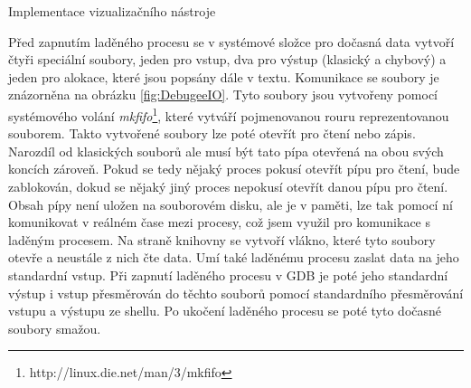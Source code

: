 \documentclass[bc,male,python,dept460]{diploma}						%
\begin{document}
\begin{section}{Implementace vizualizačního nástroje}
\begin{description}
			\par Před zapnutím laděného procesu se v systémové složce pro dočasná data vytvoří čtyři speciální soubory, jeden pro vstup, dva pro výstup
			(klasický a chybový) a jeden pro alokace, které jsou popsány dále v textu. Komunikace se soubory je znázorněna na obrázku \ref{fig:DebugeeIO}.
			Tyto soubory jsou vytvořeny pomocí systémového volání \textit{mkfifo}\footnote{http://linux.die.net/man/3/mkfifo}, které vytváří pojmenovanou rouru
			reprezentovanou souborem. Takto vytvořené soubory lze poté otevřít pro čtení nebo zápis. Narozdíl od klasických souborů ale musí být tato pípa otevřená na
			obou svých koncích zároveň. Pokud se tedy nějaký proces pokusí otevřít pípu pro čtení, bude zablokován, dokud se nějaký jiný proces nepokusí otevřít danou
			pípu pro čtení. Obsah pípy není uložen na souborovém disku, ale je v paměti, lze tak pomocí ní komunikovat v reálném čase mezi procesy, což jsem využil
			pro komunikace s laděným procesem. Na straně knihovny se vytvoří vlákno, které tyto soubory otevře a neustále z nich čte data. Umí také laděnému procesu
			zaslat data na jeho standardní vstup. Při zapnutí laděného procesu v GDB je poté jeho standardní výstup i vstup přesměrován do těchto souborů pomocí
			standardního přesměrování vstupu a výstupu ze shellu. %
			Po ukočení laděného procesu se poté tyto dočasné soubory smažou.
			

\end{description}
\end{section}
\end{document}
